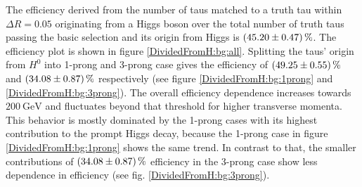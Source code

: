 %
%
The efficiency derived from the number of taus matched to a truth tau within $\Delta R=0.05$ originating from a Higgs boson over the total number of truth taus passing the basic selection and its origin from Higgs is $\SI{45.20\pm 0.47}{\percent}$. The efficiency plot is shown in figure \ref{DividedFromH:bg:all}. Splitting the taus' origin from $H^0$ into 1-prong and 3-prong case gives the efficiency of $\SI{49.25\pm 0.55}{\percent}$ and $\SI{34.08\pm 0.87}{\percent}$ respectively (see figure \ref{DividedFromH:bg:1prong} and \ref{DividedFromH:bg:3prong}). %
The overall efficiency dependence increases towards $\SI{200}{\giga\electronvolt}$ and fluctuates beyond that threshold for higher transverse momenta. This behavior is mostly dominated by the 1-prong cases with its highest contribution to the prompt Higgs decay, because the 1-prong case in figure \ref{DividedFromH:bg:1prong} shows the same trend. In contrast to that, the smaller contributions of $\SI{34.08\pm 0.87}{\percent}$ efficiency in the 3-prong case show less dependence in efficiency (see fig. \ref{DividedFromH:bg:3prong}). 
%
